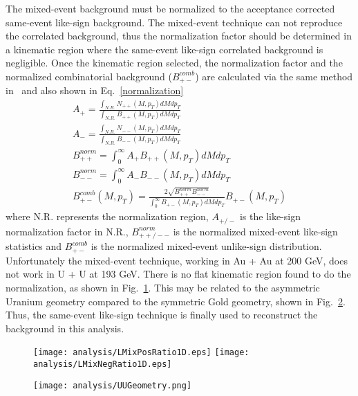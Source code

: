 The mixed-event background must be normalized to the acceptance corrected same-event like-sign background. The mixed-event technique can not reproduce the correlated background, thus the normalization factor should be determined in a kinematic region where the same-event like-sign correlated background is negligible. Once the kinematic region selected, the normalization factor and the normalized combinatorial background ($B_{+-}^{comb}$) are calculated via the same method in~\cite{PHENIX:dielectron0} and also shown in Eq.~\ref{normalization}
\begin{equation}
\begin{split}
A_{+} = \frac{\int_{N.R.}N_{++}(M,p_{T})dMdp_{T}}{\int_{N.R.}B_{++}(M,p_{T})dMdp_{T}} \\
A_{-} = \frac{\int_{N.R.}N_{--}(M,p_{T})dMdp_{T}}{\int_{N.R.}B_{--}(M,p_{T})dMdp_{T}} \\
B_{++}^{norm} = \int_{0}^{\infty}A_{+}B_{++}(M,p_{T})dMdp_{T} \\
B_{--}^{norm} = \int_{0}^{\infty}A_{-}B_{--}(M,p_{T})dMdp_{T} \\
B_{+-}^{comb}(M,p_{T}) = \frac{2\sqrt{B_{++}^{norm}B_{--}^{norm}}}{\int_{0}^{\infty}B_{+-}(M,p_{T})dMdp_{T}}B_{+-}(M,p_{T}) 
\label{normalization}
\end{split}
\end{equation}
where N.R. represents the normalization region, $A_{+/-}$ is the like-sign normalization factor in N.R., $B_{++/--}^{norm}$ is the normalized mixed-event like-sign statistics and $B_{+-}^{comb}$ is the normalized mixed-event unlike-sign distribution. Unfortunately the mixed-event technique, working in Au + Au at 200 GeV, does not work in U + U at 193 GeV. There is no flat kinematic region found to do the normalization, as shown in Fig.~\ref{likemixratio}. This may be related to the asymmetric Uranium geometry compared to the symmetric Gold geometry, shown in Fig.~\ref{geometry}. Thus, the same-event like-sign technique is finally used to reconstruct the background in this analysis.

\begin{figure}[htbp]
\centering
\texttt{[image: analysis/LMixPosRatio1D.eps]}
\texttt{[image: analysis/LMixNegRatio1D.eps]}
\label{likemixratio}
\end{figure}

\begin{figure}[htbp]
\centering
\texttt{[image: analysis/UUGeometry.png]}
 \label{geometry}
\end{figure}

